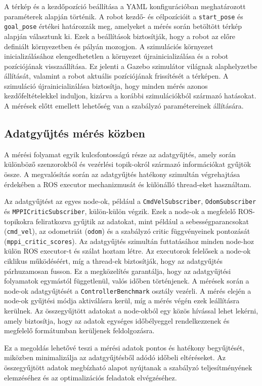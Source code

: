 A térkép és a kezdőpozíció beállítása a YAML konfigurációban meghatározott paraméterek alapján történik. A robot kezdő- és célpozícióit a \texttt{start\_pose} és \texttt{goal\_pose} értékei határozzák meg, amelyeket a mérés során betöltött térkép alapján választunk ki. Ezek a beállítások biztosítják, hogy a robot az előre definiált környezetben és pályán mozogjon. A szimulációs környezet inicializálásához elengedhetetlen a környezet újrainicializálása és a robot pozíciójának visszaállítása. Ez jelenti a Gazebo szimulátor világnak alaphelyzetbe állítását, valamint a robot aktuális pozíciójának frissítését a térképen. A szimuláció újrainicializálása biztosítja, hogy minden mérés azonos kezdőfeltételekkel induljon, kizárva a korábbi szimulációkból származó hatásokat. A mérések előtt emellett lehetőség van a szabályzó paramétereinek állítására.

\subsection{Adatgyűjtés mérés közben}
A mérési folyamat egyik kulcsfontosságú része az adatgyűjtés, amely során különböző szenzorokból és vezérlési topik-okról származó információkat gyűjtök össze. A megvalósítás során az adatgyűjtés hatékony szimultán végrehajtása érdekében a ROS executor mechanizmusát és különálló thread-eket használtam.

Az adatgyűjtést az egyes node-ok, például a \texttt{CmdVelSubscriber}, 	\texttt{OdomSubscriber} és 	\texttt{MPPICriticSubscriber}, külön-külön végzik. Ezek a node-ok a megfelelő ROS-topikokra feliratkozva gyűjtik az adatokat, mint például a sebességparancsokat (\texttt{cmd\_vel}), az odometriát (\texttt{odom}) és a szabályzó critic függvényeinek pontozását (\texttt{mppi\_critic\_scores}). Az adatgyűjtés szimultán futtatásához minden node-hoz külön ROS executor-t és szálat hoztam létre. Az executorok felelősek a node-ok ciklikus működéséért, míg a thread-ek biztosítják, hogy az adatgyűjtés párhuzamosan fusson. Ez a megközelítés garantálja, hogy az adatgyűjtési folyamatok egymástól függetlenül, valós időben történjenek. A mérések során a node-ok adatgyűjtését a \texttt{ControllerBenchmark} osztály vezérli. A mérés elején a node-ok gyűjtési módja aktiválásra kerül, míg a mérés végén ezek leállításra kerülnek. Az összegyűjtött adatokat a node-okból egy közös hívással lehet lekérni, amely biztosítja, hogy az adatok egységes időbélyeggel rendelkezzenek és megfelelő formátumban kerüljenek feldolgozásra.

Ez a megoldás lehetővé teszi a mérési adatok pontos és hatékony begyűjtését, miközben minimalizálja az adatgyűjtésből adódó időbeli eltéréseket. Az összegyűjtött adatok megbízható alapot nyújtanak a szabályzó teljesítményének elemzéséhez és az optimalizációs feladatok elvégzéséhez.

